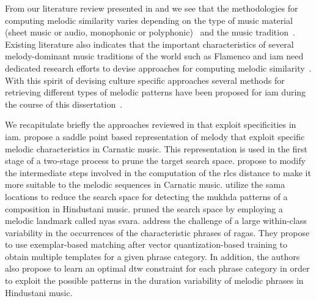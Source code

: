 From our literature review presented in  and  we see that the methodologies for computing melodic similarity varies depending on the type of music material (sheet music or audio, monophonic or polyphonic)~\citep{Marsden2012,meredith2002algorithms,Cambouropoulos2001,collins2014bridging,ghias1995query,dannenberg2007comparative,mazzoni2001melody} and the music tradition~\citep{Juhasz2009a, Conklin2010a,Lartillot2006,pikrakis2003recognition}. Existing literature also indicates that the important characteristics of several melody-dominant music traditions of the world such as Flamenco and \acrfull{iam} need dedicated research efforts to devise approaches for computing melodic similarity~\citep{gomez2012automatic,pikrakis2012tracking,pikrakis2016detection,Rao2014}. With this spirit of devising culture specific approaches several methods for retrieving different types of melodic patterns have been proposed for \gls{iam} during the course of this dissertation~\citep{Ross2012b,Ross2012,ishwar2012motivic,Rao2014,Ishwar2013,Dutta2014,dutta2014modified}. 

We recapitulate briefly the approaches reviewed in  that exploit specificities in \gls{iam}.  \cite{Ishwar2013} propose a saddle point based representation of melody that exploit specific melodic characteristics in Carnatic music. This representation is used in the first stage of a two-stage process to prune the target search space. \cite{dutta2014modified} propose to modify the intermediate steps involved in the computation of the \gls{rlcs} distance to make it more suitable to the melodic sequences in Carnatic music.  \cite{Ross2012b} utilize the \gls{sama} locations to reduce the search space for detecting the \gls{mukhda} patterns of a composition in Hindustani music. \citep{Ross2012} pruned the search space by employing a melodic landmark called \gls{nyas} \gls{svara}. \cite{Rao2014} address the challenge of a large within-class variability in the occurrences of the characteristic phrases of \glspl{raga}. They propose to use exemplar-based matching after vector quantization-based training to obtain multiple templates for a given phrase category. In addition, the authors also propose to learn an optimal \gls{dtw} constraint for each phrase category in order to exploit the possible patterns in the duration variability of melodic phrases in Hindustani music. 

